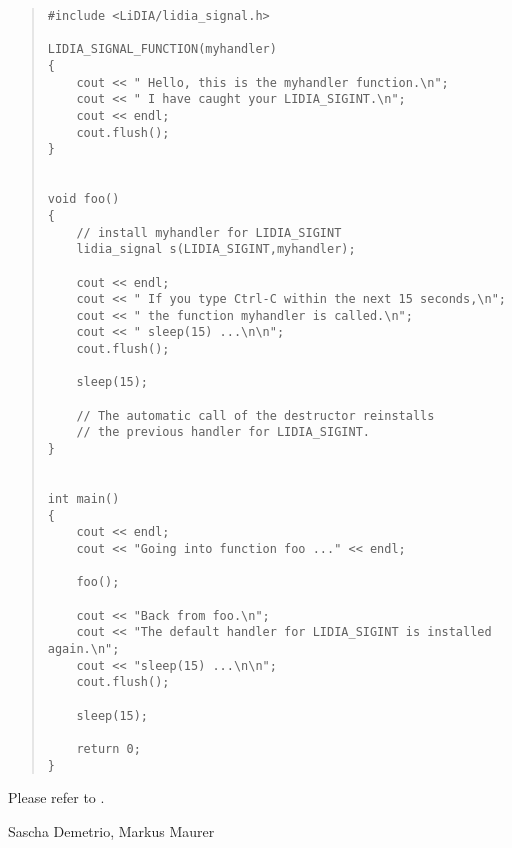 \begin{quote}
\begin{verbatim}
#include <LiDIA/lidia_signal.h>

LIDIA_SIGNAL_FUNCTION(myhandler)
{
    cout << " Hello, this is the myhandler function.\n";
    cout << " I have caught your LIDIA_SIGINT.\n";
    cout << endl;
    cout.flush();
}


void foo()
{
    // install myhandler for LIDIA_SIGINT
    lidia_signal s(LIDIA_SIGINT,myhandler);

    cout << endl;
    cout << " If you type Ctrl-C within the next 15 seconds,\n";
    cout << " the function myhandler is called.\n";
    cout << " sleep(15) ...\n\n";
    cout.flush();

    sleep(15);

    // The automatic call of the destructor reinstalls
    // the previous handler for LIDIA_SIGINT.
}


int main()
{
    cout << endl;
    cout << "Going into function foo ..." << endl;

    foo();

    cout << "Back from foo.\n";
    cout << "The default handler for LIDIA_SIGINT is installed again.\n";
    cout << "sleep(15) ...\n\n";
    cout.flush();

    sleep(15);

    return 0;
}
\end{verbatim}
\end{quote}

Please refer to .



\AUTHOR

Sascha Demetrio, Markus Maurer
